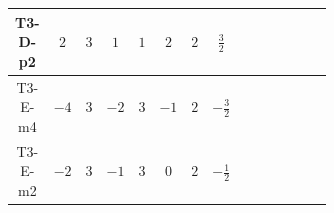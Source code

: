 \documentclass[8pt]{article}
\begin{document}
\begin{landscape}
\begin{longtable}{@{}cccccccc >{\raggedright\arraybackslash}p{0.21\linewidth} >{\raggedright\arraybackslash}p{0.21\linewidth} >{\raggedright\arraybackslash}p{0.21\linewidth}@{}}
\midrule
T3-D-p2 & $2$ & $3$ & $1$ & $1$ & $2$ & $2$ & $\frac{3}{2}$ &  & \scriptsize\adjustbox{max width=\linewidth}{$\begin{gathered} -2 \hbar  \log \left(\frac{\bar{\mu}^{2}}{M_F^2}\right) \overline{y_{2,i_1,r_1}} \overline{Y_{e,i_2,i_3}} H_{a_1} S_2 y_{2,i_2,r_1} Y_{e,i_1,i_3} H_{a_1}{}^{\dagger } S_2{}^{\dagger } \\ -2 \hbar  \log \left(\frac{\bar{\mu}^{2}}{M_F^2}\right) \overline{y_{2,i_1,r_1}} H_{a_2} S_2 y_{2,i_1,r_1} H_{a_1}{}^{\dagger } S_2{}^{\dagger } \mathcal{I}_{H2,a_1,a_2}{}^1 \lambda_{HS_2}^{(1)}^{(1)}\end{gathered}$} &  \\
\midrule
T3-E-m4 & $-4$ & $3$ & $-2$ & $3$ & $-1$ & $2$ & $-\frac{3}{2}$ &  & \scriptsize\adjustbox{max width=\linewidth}{$\begin{gathered} -\frac{2 \hbar  \log \left(\frac{\bar{\mu}^{2}}{M_F^2}\right) \overline{y_{2,i_1,r_1}} \overline{Y_{e,i_2,i_3}} H_{a_1} S_{2,j_1} y_{2,i_2,r_1} Y_{e,i_1,i_3} H_{a_1}{}^{\dagger } S_{2,j_1}{}^{\dagger }}{\sqrt{3}} \\ +2 i \sqrt{\frac{2}{3}} \hbar  \log \left(\frac{\bar{\mu}^{2}}{M_F^2}\right) \overline{y_{2,i_1,r_1}} \overline{Y_{e,i_2,i_3}} H_{a_2} S_{2,j_2} y_{2,i_2,r_1} Y_{e,i_1,i_3} H_{a_1}{}^{\dagger } S_{2,j_1}{}^{\dagger } \mathcal{I}_{H1,a_1,a_2,j_2,j_1}{}^1 \\ -\frac{2 \hbar  \log \left(\frac{\bar{\mu}^{2}}{M_F^2}\right) \overline{y_{2,i_1,r_1}} H_{a_2} S_{2,j_2} y_{2,i_1,r_1} H_{a_1}{}^{\dagger } S_{2,j_1}{}^{\dagger } \mathcal{I}_{H2,a_1,a_2,j_1,j_2}{}^2 \lambda_{HS_2}^{(1)}^{(2)}}{\sqrt{3}}\end{gathered}$} &  \\
\midrule
T3-E-m2 & $-2$ & $3$ & $-1$ & $3$ & $0$ & $2$ & $-\frac{1}{2}$ &  & \scriptsize\adjustbox{max width=\linewidth}{$\begin{gathered} -\frac{2 \hbar  \log \left(\frac{\bar{\mu}^{2}}{M_F^2}\right) \overline{y_{2,i_1,r_1}} \overline{Y_{e,i_2,i_3}} H_{a_1} S_{2,j_1} y_{2,i_2,r_1} Y_{e,i_1,i_3} H_{a_1}{}^{\dagger } S_{2,j_1}{}^{\dagger }}{\sqrt{3}} \\ +2 i \sqrt{\frac{2}{3}} \hbar  \log \left(\frac{\bar{\mu}^{2}}{M_F^2}\right) \overline{y_{2,i_1,r_1}} \overline{Y_{e,i_2,i_3}} H_{a_2} S_{2,j_2} y_{2,i_2,r_1} Y_{e,i_1,i_3} H_{a_1}{}^{\dagger } S_{2,j_1}{}^{\dagger } \mathcal{I}_{H1,a_1,a_2,j_2,j_1}{}^1 \\ -\frac{2 \hbar  \log \left(\frac{\bar{\mu}^{2}}{M_F^2}\right) \overline{y_{2,i_1,r_1}} H_{a_2} S_{2,j_2} y_{2,i_1,r_1} H_{a_1}{}^{\dagger } S_{2,j_1}{}^{\dagger } \mathcal{I}_{H2,a_1,a_2,j_1,j_2}{}^2 \lambda_{HS_2}^{(1)}^{(2)}}{\sqrt{3}}\end{gathered}$} &  \\

\end{longtable}
\end{landscape}
\end{document}
